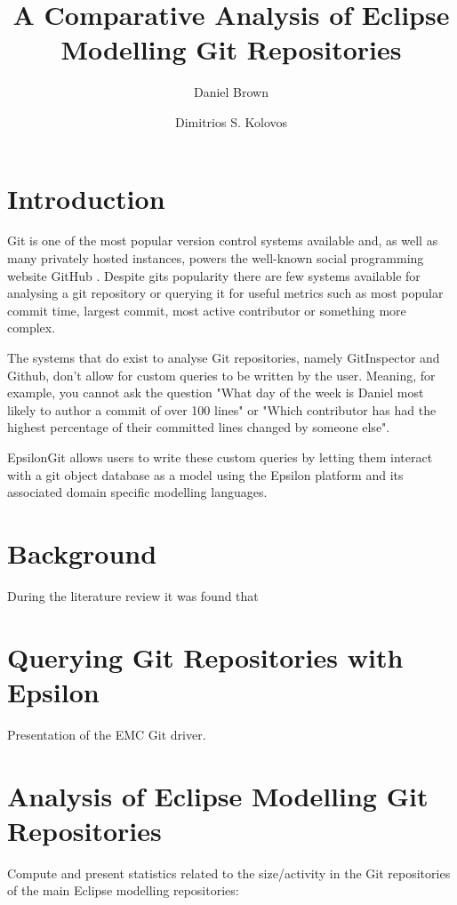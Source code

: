 \documentclass[runningheads,a4paper]{llncs}
\begin{document}
\title{A Comparative Analysis of Eclipse Modelling Git Repositories}
\author{Daniel Brown\and Dimitrios S. Kolovos}
\maketitle

\begin{abstract}

\end{abstract}

\section{Introduction}
Git is one of the most popular version control systems available \cite{gitpopularity} and, as well as many privately hosted instances, powers the well-known social programming website GitHub \cite{gitpowersgithub}. Despite gits popularity there are few systems available for analysing a git repository or querying it for useful metrics such as most popular commit time, largest commit, most active contributor or something more complex.

The systems that do exist to analyse Git repositories, namely GitInspector \cite{gitinspector} and Github, don't allow for custom queries to be written by the user. Meaning, for example, you cannot ask the question "What day of the week is Daniel most likely to author a commit of over 100 lines" or "Which contributor has had the highest percentage of their committed lines changed by someone else". 

EpsilonGit allows users to write these custom queries by letting them interact with a git object database as a model using the Epsilon platform and its associated domain specific modelling languages.

\section{Background}
During the literature review it was found that 

\section{Querying Git Repositories with Epsilon}
Presentation of the EMC Git driver.

\section{Analysis of Eclipse Modelling Git Repositories}
Compute and present statistics related to the size/activity in the Git repositories of the main Eclipse modelling repositories:
\end{document}
